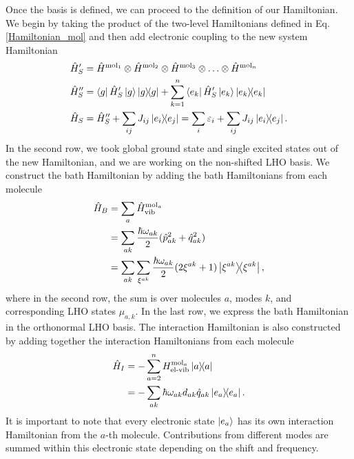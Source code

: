 Once the basis is defined, we can proceed to the definition of our Hamiltonian. We begin by taking the product of the two-level Hamiltonians defined in Eq. \ref{Hamiltonian_mol} and then add electronic coupling to the new system Hamiltonian
\begin{equation}
    \begin{aligned}
    \hat{H}^\prime_S &= \hat{H}^{\text{mol}_1} \otimes \hat{H}^{\text{mol}_2} \otimes \hat{H}^{\text{mol}_3} \otimes \ldots \otimes \hat{H}^{\text{mol}_n} \\
    \hat{H}^{\prime\prime}_S &= \bra{g} \hat{H}^\prime_S \ket{g} \ketbra{g} + \sum_{k=1}^n \bra{e_k} \hat{H}^\prime_S \ket{e_k}\ketbra{e_k} \\
    \hat{H}_S &= \hat{H}^{\prime\prime}_S + \sum_{ij} J_{ij} \ketbra{e_i}{e_j} = \sum_{i} \varepsilon_i  + \sum_{ij} J_{ij} \ketbra{e_i}{e_j}.
    \end{aligned}
\end{equation}
In the second row, we took global ground state and single excited states out of the new Hamiltonian, and we are working on the non-shifted LHO basis. We construct the bath Hamiltonian by adding the bath Hamiltonians from each molecule
\begin{equation}
    \begin{aligned}
    \hat{H}_B &= \sum_a \hat{H}^{\text{mol}_a}_\text{vib} \\
    &= \sum_{ak} \frac{\hbar \omega_{ak}}{2}(\hat{p}^2_{ak} + \hat{q}^2_{ak}) \\
    &= \sum_{ak} \sum_{\xi^{ak}} \frac{\hbar \omega_{ak}}{2} (2\xi^{ak} + 1)\ketbra{\xi^{ak}},
    \end{aligned}
\end{equation}
where in the second row, the sum is over molecules $a$, modes $k$, and corresponding LHO states $\mu_{a,k}$. In the last row, we express the bath Hamiltonian in the orthonormal LHO basis. The interaction Hamiltonian is also constructed by adding together the interaction Hamiltonians from each molecule
\begin{equation}
\label{interaction_hamiltonian_nonshifted}
    \begin{aligned}
    \hat{H}_I &= - \sum_{a=2}^n H^{\text{mol}_a}_\text{el-vib}\ketbra{a} \\
    &= - \sum_{ak} \hbar\omega_{ak} d_{ak}\hat{q}_{ak}\ketbra{e_a}. \\
    \end{aligned}
\end{equation}
It is important to note that every electronic state $\ket{e_a}$ has its own interaction Hamiltonian from the $a$-th molecule. Contributions from different modes are summed within this electronic state depending on the shift and frequency.

